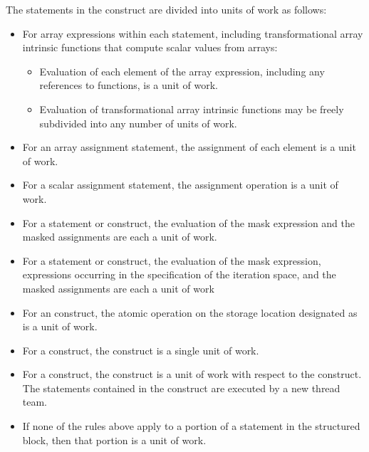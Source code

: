 The statements in the  construct are divided into units of work as follows:

\begin{itemize}
\item For array expressions within each statement, including transformational array 
intrinsic functions that compute scalar values from arrays:

\begin{itemize} %
\item Evaluation of each element of the array expression, including any references to 
 functions, is a unit of work.

\item Evaluation of transformational array intrinsic functions may be freely subdivided 
into any number of units of work.
\end{itemize}

\item For an array assignment statement, the assignment of each element is a unit of work.

\item For a scalar assignment statement, the assignment operation is a unit of work.

\item For a  statement or construct, the evaluation of the mask expression and the 
masked assignments are each a unit of work.

\item For a  statement or construct, the evaluation of the mask expression, 
expressions occurring in the specification of the iteration space, and the masked 
assignments are each a unit of work

\item For an  construct, the atomic operation on the storage location designated as 
 is a unit of work.

\item For a  construct, the construct is a single unit of work.

\item For a  construct, the construct is a unit of work with respect to the 
 construct. The statements contained in the  construct are 
executed by a new thread team.

\item If none of the rules above apply to a portion of a statement in the structured block, 
then that portion is a unit of work.
\end{itemize}

